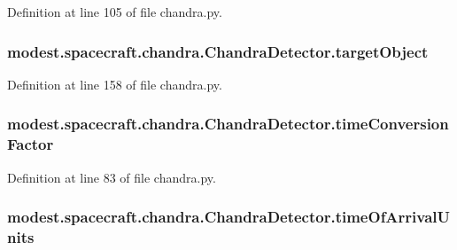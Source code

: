 Definition at line 105 of file chandra.\+py.

\subsubsection[{\texorpdfstring{target\+Object}{targetObject}}]{\setlength{\rightskip}{0pt plus 5cm}modest.\+spacecraft.\+chandra.\+Chandra\+Detector.\+target\+Object}\hypertarget{classmodest_1_1spacecraft_1_1chandra_1_1ChandraDetector_ab631efc116ca4b41fb15a81322a7ce47}{}\label{classmodest_1_1spacecraft_1_1chandra_1_1ChandraDetector_ab631efc116ca4b41fb15a81322a7ce47}


Definition at line 158 of file chandra.\+py.

\subsubsection[{\texorpdfstring{time\+Conversion\+Factor}{timeConversionFactor}}]{\setlength{\rightskip}{0pt plus 5cm}modest.\+spacecraft.\+chandra.\+Chandra\+Detector.\+time\+Conversion\+Factor}\hypertarget{classmodest_1_1spacecraft_1_1chandra_1_1ChandraDetector_a5301d26739b9fd619f0d82a13ad24880}{}\label{classmodest_1_1spacecraft_1_1chandra_1_1ChandraDetector_a5301d26739b9fd619f0d82a13ad24880}


Definition at line 83 of file chandra.\+py.

\subsubsection[{\texorpdfstring{time\+Of\+Arrival\+Units}{timeOfArrivalUnits}}]{\setlength{\rightskip}{0pt plus 5cm}modest.\+spacecraft.\+chandra.\+Chandra\+Detector.\+time\+Of\+Arrival\+Units}\hypertarget{classmodest_1_1spacecraft_1_1chandra_1_1ChandraDetector_ab78cc698e928c6ff3ab182fc3f241990}{}\label{classmodest_1_1spacecraft_1_1chandra_1_1ChandraDetector_ab78cc698e928c6ff3ab182fc3f241990}


